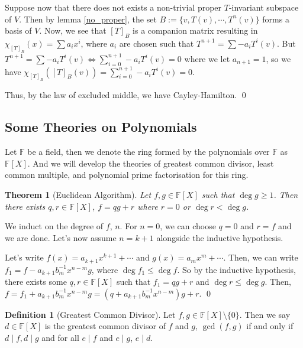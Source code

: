 \documentclass[
]{article}
\newtheorem{theorem}{Theorem}
\theoremstyle{definition}
\newtheorem{definition}{Definition}[section]
\begin{document}
Suppose now that there does not exists a non-trivial proper
\(T\)-invariant subspace of \(V\). Then by lemma \ref{no_proper}, the
set \(B := \{v, T(v), \cdots, T^n(v)\}\) forms a basis of \(V\). Now, we
see that \([T]_B\) is a companion matrix resulting in
\(\chi_{[T]_B}(x) = \sum a_i x^i\), where \(a_i\) are chosen such that
\(T^{n + 1} = \sum -a_i T^i(v)\). But
\(T^{n + 1} = \sum -a_i T^i(v) \iff \sum_{i = 0}^{n + 1} -a_i T^i(v) = 0\)
where we let \(a_{n + 1} = 1\), so we have
\(\chi_{[T]_B}([T]_B(v)) =  \sum_{i = 0}^{n + 1} -a_i T^i(v) = 0\).

Thus, by the law of excluded middle, we have Cayley-Hamilton. \qed

\hypertarget{some-theories-on-polynomials}{%
\subsection{Some Theories on
Polynomials}\label{some-theories-on-polynomials}}

Let \(\mathbb{F}\) be a field, then we denote the ring formed by the
polynomials over \(\mathbb{F}\) as \(\mathbb{F}[X]\). And we will
develop the theories of greatest common divisor, least common multiple,
and polynomial prime factorisation for this ring.

\begin{theorem}[Euclidean Algorithm]
  Let \(f, g \in \mathbb{F}[X]\) such that \(\deg g \ge 1\). Then there 
  exists \(q, r \in \mathbb{F}[X]\), \(f = q g + r\) where \(r = 0\) or 
  \(\deg r < \deg g\).
\end{theorem}
\proof

We induct on the degree of \(f\), \(n\). For \(n = 0\), we can choose
\(q = 0\) and \(r = f\) and we are done. Let's now assume \(n = k + 1\)
alongside the inductive hypothesis.

Let's write \(f(x) = a_{k + 1}x^{k + 1} + \cdots\) and
\(g(x) = a_m x^m + \cdots\). Then, we can write
\(f_1 = f - a_{k + 1} b_m^{-1} x^{n - m} g\), where
\(\deg f_1 \le \deg f\). So by the inductive hypothesis, there exists
some \(q, r \in \mathbb{F}[X]\) such that \(f_1 = q g + r\) and
\(\deg r \le \deg g\). Then,
\(f = f_1 + a_{k + 1} b_m^{-1} x^{n - m} g  = (q + a_{k + 1} b_m^{-1} x^{n - m}) g + r\).
\qed

\begin{definition}[Greatest Common Divisor]
  Let \(f, g \in \mathbb{F}[X] \setminus \{0\}\). Then we say \(d \in \mathbb{F}[X]\) 
  is the greatest common divisor of \(f\) and \(g\), \(\gcd(f, g)\) if and only 
  if \(d \mid f, d \mid g\) and for all \(e \mid f\) and \(e \mid g\), \(e \mid d\). 
\end{definition}
\end{document}
